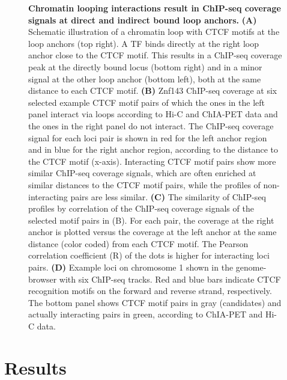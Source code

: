 \documentclass[a4paper,twoside=true,openright,parskip=full,chapterprefix=true,11pt,headings=normal,bibliography=totoc,listof=totoc,titlepage=on,captions=tableabove,draft=false]{scrreprt}
\theoremstyle{definition}
\theoremstyle{definition}
\theoremstyle{definition}
\theoremstyle{remark}
\begin{document}
\begin{figure}
\caption{\textbf{Chromatin looping interactions result in
ChIP-seq coverage signals at direct and indirect bound loop anchors.}
\textbf{(A)} Schematic illustration of a chromatin loop with CTCF motifs
at the loop anchors (top right). A TF binds directly at the right loop
anchor close to the CTCF motif. This results in a ChIP-seq coverage peak
at the directly bound locus (bottom right) and in a minor signal at the
other loop anchor (bottom left), both at the same distance to each CTCF
motif. \textbf{(B)} Znf143 ChIP-seq coverage at six selected example
CTCF motif pairs of which the ones in the left panel interact via loops
according to Hi-C and ChIA-PET data and the ones in the right panel do
not interact. The ChIP-seq coverage signal for each loci pair is shown
in red for the left anchor region and in blue for the right anchor
region, according to the distance to the CTCF motif (x-axis).
Interacting CTCF motif pairs show more similar ChIP-seq coverage
signals, which are often enriched at similar distances to the CTCF motif
pairs, while the profiles of non-interacting pairs are less similar.
\textbf{(C)} The similarity of ChIP-seq profiles by correlation of the
ChIP-seq coverage signals of the selected motif pairs in (B). For each
pair, the coverage at the right anchor is plotted versus the coverage at
the left anchor at the same distance (color coded) from each CTCF motif.
The Pearson correlation coefficient (R) of the dots is higher for
interacting loci pairs. \textbf{(D)} Example loci on chromosome 1 shown
in the genome-browser with six ChIP-seq tracks. Red and blue bars
indicate CTCF recognition motifs on the forward and reverse strand,
respectively. The bottom panel shows CTCF motif pairs in gray
(candidates) and actually interacting pairs in green, according to
ChIA-PET and Hi-C data.}\label{fig:LoopPred1}
\end{figure}





























\hypertarget{results-3}{%
\section{Results}\label{results-3}}
\end{document}

